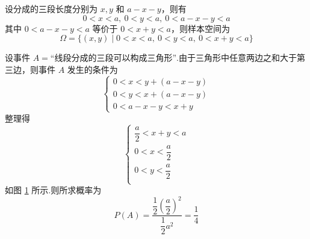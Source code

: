 \begin{solution}
    设分成的三段长度分别为 $x, y$ 和 $a-x-y$，则有
    $$
    0<x<a,\ 0<y<a,\ 0 < a-x-y < a
    $$
    其中 $0 < a-x-y < a$ 等价于 $0 < x+y < a$，则样本空间为
    $$
    \varOmega = \{ (x,y) \mid 0<x<a,\ 0<y<a,\ 0 < x+y < a \}
    $$

    设事件 $A = \text{“线段分成的三段可以构成三角形”}$.由于三角形中任意两边之和大于第三边，则事件 $A$ 发生的条件为
    $$
    \begin{cases}
        0 < x < y + (a-x-y) \\
        0 < y < x + (a-x-y) \\
        0 < a-x-y < x+y
    \end{cases}
    $$
    整理得
    $$
    \begin{cases}
        \dfrac{a}{2} < x+y < a \\
        0 < x < \dfrac{a}{2} \\[0.2em]
        0 < y < \dfrac{a}{2} \\
    \end{cases}
    $$
    如图 \ref{fig:example-三角形} 所示.则所求概率为
    $$
    P(A) = \dfrac{\dfrac{1}{2} \left( \dfrac{a}{2} \right)^2}{\dfrac{1}{2} a^2} = \dfrac{1}{4}
    $$

    \begin{figure}[H]
        \centering


        \vspace{-0.8em}
        
        \caption{}
        \label{fig:example-三角形}
    \end{figure}
\end{solution}

